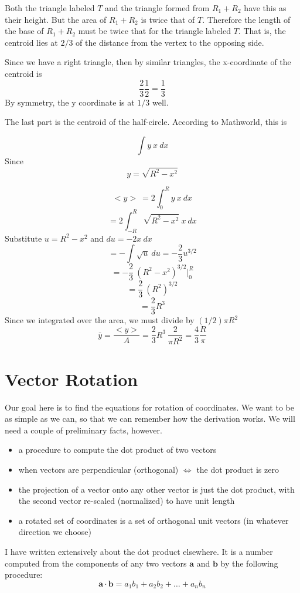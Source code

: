 \documentclass[11pt, oneside]{report}   	%
\begin{document}
Both the triangle labeled $T$ and the triangle formed from $R_1 + R_2$ have this as their height.  But the area of $R_1 + R_2$ is twice that of $T$.  Therefore the length of the base of $R_1 + R_2$ must be twice that for the triangle labeled $T$.  That is, the centroid lies at $2/3$ of the distance from the vertex to the opposing side.

Since we have a right triangle, then by similar triangles, the x-coordinate of the centroid is 
\[ \frac{2}{3} \frac{1}{2}= \frac{1}{3}\]
By symmetry, the y coordinate is at $1/3$ well.

The last part is the centroid of the half-circle.  According to Mathworld, this is

\[ \int y \ x \ dx \]
Since
\[ y = \sqrt{R^2-x^2} \]

\[ <y> \ = 2 \int_{0}^{R} y \ x \ dx \]
\[= 2 \int_{-R}^{R} \sqrt{R^2-x^2} \ x \ dx\]
Substitute $u=R^2-x^2$ and $du = -2x \ dx$
\[ = -\int \sqrt{u} \ du  = -\frac{2}{3} u^{3/2} \]
\[ = -\frac{2}{3} \ (R^2-x^2)^{3/2} \bigg |_0^R \]
\[ = \frac{2}{3} \ (R^2)^{3/2} \]
\[ = \frac{2}{3}R^3 \]
Since we integrated over the area, we must divide by $(1/2)\pi R^2$
\[ \bar{y} = \frac{<y>}{A} = \frac{2}{3}R^3 \ \frac{2}{\pi R^2} = \frac{4}{3} \frac{R}{\pi} \]

\chapter{Vector Rotation}
Our goal here is to find the equations for rotation of coordinates.  We want to be as simple as we can, so that we can remember how the derivation works.  We will need a couple of preliminary facts, however.

\begin{itemize}
\item a procedure to compute the dot product of two vectors
\item when vectors are perpendicular (orthogonal) $\iff$ the dot product is zero
\item the projection of a vector onto any other vector is just the dot product, with the second vector re-scaled (normalized) to have unit length
\item a rotated set of coordinates is a set of orthogonal unit vectors (in whatever direction we choose)
\end{itemize}

I have written extensively about the dot product elsewhere.  It is a number computed from the components of any two vectors $\mathbf{a}$ and $\mathbf{b}$ by the following procedure:
\[ \mathbf{a} \cdot \mathbf{b} = a_1 b_1 + a_2 b_2 + \dots + a_n b_n \]
\end{document}
